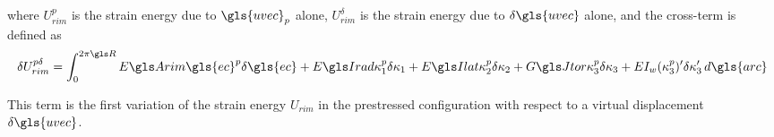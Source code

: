 \documentclass[\rootdir/thesis.tex]{subfiles}
\begin{document}
where $U_{rim}^p$ is the strain energy due to $\gls{uvec}_p$ alone, $U_{rim}^{\delta}$ is the strain energy due to $\delta\gls{uvec}$ alone, and the cross-term is defined as
\begin{equation}
\label{eq:U_rim_pd}
\delta U_{rim}^{p\delta} = \int_0^{2\pi \R}
	\EA\gls{ec}^p \delta\gls{ec} +
	\EIr\kappa_1^p\delta\kappa_1 +
	\EIl\kappa_2^p\delta\kappa_2 +
	\GJ\kappa_3^p\delta\kappa_3 +
	EI_w(\kappa_3^p)'\delta\kappa_3'\, d\gls{arc}
\end{equation}

This term is the first variation of the strain energy $U_{rim}$ in the prestressed configuration with respect to a virtual displacement $\delta\gls{uvec}$.
\end{document}
